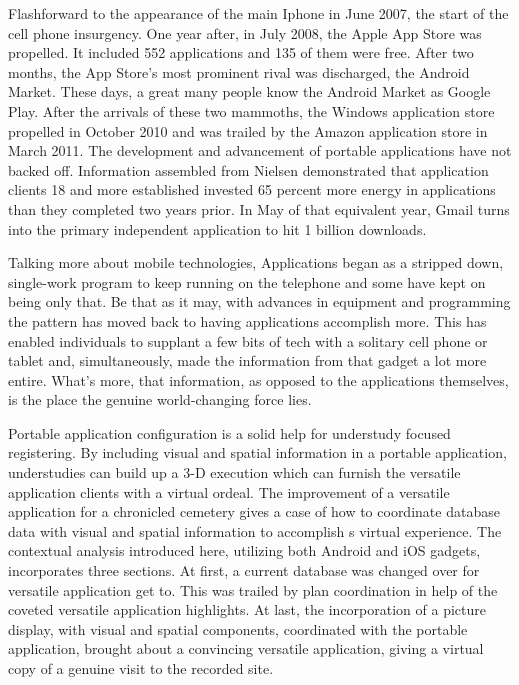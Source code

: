 Flashforward to the appearance of the main Iphone in June 2007, the start of the cell phone insurgency. One year after, in July 2008, the Apple App Store was propelled. It included 552 applications and 135 of them were free. After two months, the App Store's most prominent rival was discharged, the Android Market. These days, a great many people know the Android Market as Google Play. After the arrivals of these two mammoths, the Windows application store propelled in October 2010 and was trailed by the Amazon application store in March 2011. The development and advancement of portable applications have not backed off. Information assembled from Nielsen demonstrated that application clients 18 and more established invested 65 percent more energy in applications than they completed two years prior. In May of that equivalent year, Gmail turns into the primary independent application to hit 1 billion downloads.

Talking more about mobile technologies, Applications began as a stripped down, single-work program to keep running on the telephone and some have kept on being only that. Be that as it may, with advances in equipment and programming the pattern has moved back to having applications accomplish more. This has enabled individuals to supplant a few bits of tech with a solitary cell phone or tablet and, simultaneously, made the information from that gadget a lot more entire. What's more, that information, as opposed to the applications themselves, is the place the genuine world-changing force lies.

Portable application configuration is a solid help for understudy focused registering. By including visual and spatial information in a portable application, understudies can build up a 3-D execution which can furnish the versatile application clients with a virtual ordeal. The improvement of a versatile application for a chronicled cemetery gives a case of how to coordinate database data with visual and spatial information to accomplish s virtual experience. The contextual analysis introduced here, utilizing both Android and \gls{iOS} gadgets, incorporates three sections. At first, a current database was changed over for versatile application get to. This was trailed by plan coordination in help of the coveted versatile application highlights. At last, the incorporation of a picture display, with visual and spatial components, coordinated with the portable application, brought about a convincing versatile application, giving a virtual copy of a genuine visit to the recorded site.

